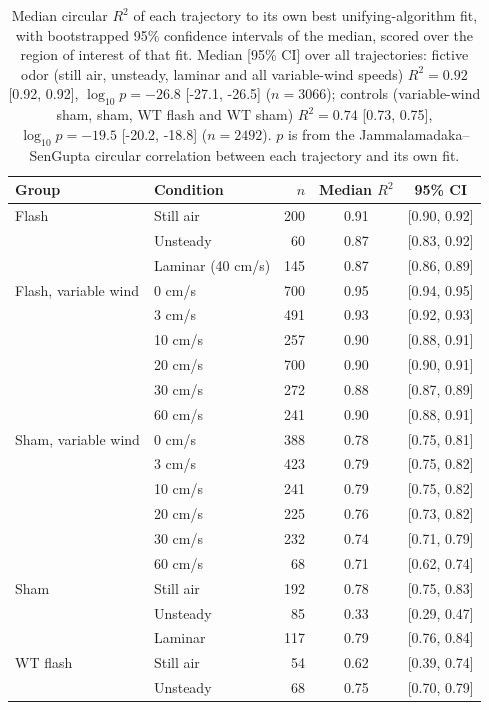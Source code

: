 \begin{table}[ht]
\centering
\caption{Median circular $R^2$ of each trajectory to its own best unifying-algorithm fit, with bootstrapped 95\% confidence intervals of the median, scored over the region of interest of that fit. Median [95\% CI] over all trajectories: fictive odor (still air, unsteady, laminar and all variable-wind speeds) $R^2 = 0.92$ [0.92, 0.92], $\log_{10} p = -26.8$ [-27.1, -26.5] ($n = 3066$); controls (variable-wind sham, sham, WT flash and WT sham) $R^2 = 0.74$ [0.73, 0.75], $\log_{10} p = -19.5$ [-20.2, -18.8] ($n = 2492$). $p$ is from the Jammalamadaka--SenGupta circular correlation between each trajectory and its own fit.}
\label{tab:own_fit_r2}
\begin{tabular}{llrcc}
\hline
Group & Condition & $n$ & Median $R^2$ & 95\% CI \\
\hline
Flash & Still air & 200 & 0.91 & [0.90, 0.92] \\
 & Unsteady & 60 & 0.87 & [0.83, 0.92] \\
 & Laminar (40 cm/s) & 145 & 0.87 & [0.86, 0.89] \\
\hline
Flash, variable wind & 0 cm/s & 700 & 0.95 & [0.94, 0.95] \\
 & 3 cm/s & 491 & 0.93 & [0.92, 0.93] \\
 & 10 cm/s & 257 & 0.90 & [0.88, 0.91] \\
 & 20 cm/s & 700 & 0.90 & [0.90, 0.91] \\
 & 30 cm/s & 272 & 0.88 & [0.87, 0.89] \\
 & 60 cm/s & 241 & 0.90 & [0.88, 0.91] \\
\hline
Sham, variable wind & 0 cm/s & 388 & 0.78 & [0.75, 0.81] \\
 & 3 cm/s & 423 & 0.79 & [0.75, 0.82] \\
 & 10 cm/s & 241 & 0.79 & [0.75, 0.82] \\
 & 20 cm/s & 225 & 0.76 & [0.73, 0.82] \\
 & 30 cm/s & 232 & 0.74 & [0.71, 0.79] \\
 & 60 cm/s & 68 & 0.71 & [0.62, 0.74] \\
\hline
Sham & Still air & 192 & 0.78 & [0.75, 0.83] \\
 & Unsteady & 85 & 0.33 & [0.29, 0.47] \\
 & Laminar & 117 & 0.79 & [0.76, 0.84] \\
\hline
WT flash & Still air & 54 & 0.62 & [0.39, 0.74] \\
 & Unsteady & 68 & 0.75 & [0.70, 0.79] \\

\end{tabular}
\end{table}
